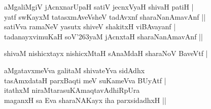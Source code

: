 \begin{entry}
\begin{shl}
aMgaliMgiV jAcnxnarUpaH satiV jecnxVyaH shivaH patiH |\\
yatf swKayxM tatasxmAveVsheV tadAvxnf sharaNanAmavAnf ||\\
satiVva ramaNeV yasutx shiveV shakitxH viBAvayanf |\\
tadanayxvimuKaH soV{\char'263}yaM jAcnxtaH sharaNanAmavAnf ||
\end{shl}
\begin{shl}
shivaM nishicxtayx nishicxMtaH sAnaMdaH sharaNoV BaveVtf |
\end{shl}
\begin{shl}
aMgatavxmeVva galitaM shivateYva sidAdhx\\
tasAmxdataH parxBaqti meV suKameVva BUyAtf |\\
itathxM niraMtarasuKAmaqtavAdhiRpUra\\
maganxH sa Eva sharaNAKayx iha parxsidadhxH ||
\end{shl}


\end{entry}
